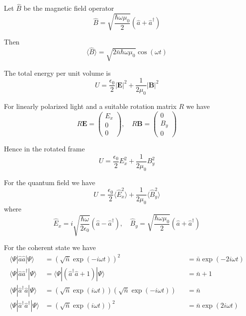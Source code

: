 \documentclass[12pt]{article}
\begin{document}
Let $\hat B$ be the magnetic field operator
\begin{equation*}
\hat B=\sqrt{\frac{\hbar\omega\mu_0}{2}}
(\hat a+\hat a^\dag)
\end{equation*}

Then
\begin{equation*}
\langle\hat B\rangle=\sqrt{2\bar n\hbar\omega\mu_0}\cos(\omega t)
\end{equation*}

The total energy per unit volume is
\begin{equation*}
U=\frac{\epsilon_0}{2}|\mathbf E|^2+\frac{1}{2\mu_0}|\mathbf B|^2
\end{equation*}

For linearly polarized light and a suitable rotation matrix $R$ we have
\begin{equation*}
R\mathbf E=\begin{pmatrix}E_x\\0\\0\end{pmatrix},
\quad
R\mathbf B=\begin{pmatrix}0\\B_y\\0\end{pmatrix}
\end{equation*}

Hence in the rotated frame
\begin{equation*}
U=\frac{\epsilon_0}{2}E_x^2+\frac{1}{2\mu_0}B_y^2
\end{equation*}

For the quantum field we have
\begin{equation*}
U=\frac{\epsilon_0}{2}\langle\hat E_x^2\rangle+\frac{1}{2\mu_0}\langle\hat B_y^2\rangle
\end{equation*}
where
\begin{equation*}
\hat E_x=i\sqrt{\frac{\hbar\omega}{2\epsilon_0}}(\hat a-\hat a^\dag),
\quad
\hat B_y=\sqrt{\frac{\hbar\omega\mu_0}{2}}(\hat a+\hat a^\dag)
\end{equation*}

For the coherent state we have
\begin{align*}
\langle\Psi|\hat a\hat a|\Psi\rangle&=\left(\sqrt{\bar n}\exp(-i\omega t)\right)^2
& &=\bar n\exp(-2i\omega t)
\\
\langle\Psi|\hat a\hat a^\dag|\Psi\rangle&=\langle\Psi|(\hat a^\dag\hat a+1)|\Psi\rangle
& &=\bar n+1
\\
\langle\Psi|\hat a^\dag\hat a|\Psi\rangle
&=\left(\sqrt{\bar n}\exp(i\omega t)\right)\left(\sqrt{\bar n}\exp(-i\omega t)\right)
& &=\bar n
\\
\langle\Psi|\hat a^\dag\hat a^\dag|\Psi\rangle&=\left(\sqrt{\bar n}\exp(i\omega t)\right)^2
& &=\bar n\exp(2i\omega t)
\end{align*}
\end{document}
